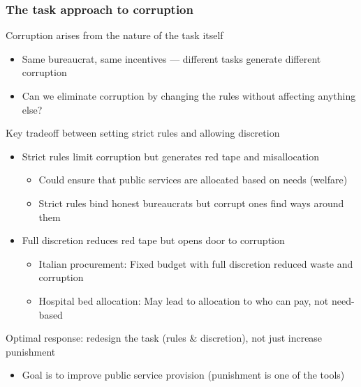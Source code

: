 \documentclass[aspectratio=169]{beamer}
\begin{document}
\begin{frame}
\frametitle{The task approach to corruption}
Corruption arises from the nature of the task itself
\begin{itemize}\setlength\itemsep{3pt}
\item Same bureaucrat, same incentives — different tasks generate different corruption
\item Can we eliminate corruption by changing the rules without affecting anything else?
\end{itemize}\medskip
Key tradeoff between setting strict rules and allowing discretion
\begin{itemize}\setlength\itemsep{3pt}
\item Strict rules limit corruption but generates red tape and misallocation
\begin{itemize}\setlength\itemsep{3pt}
\item Could ensure that public services are allocated based on needs (welfare)
\item Strict rules bind honest bureaucrats but corrupt ones find ways around them
\end{itemize}
\item Full discretion reduces red tape but opens door to corruption
\begin{itemize}\setlength\itemsep{3pt}
\item Italian procurement: Fixed budget with full discretion reduced waste and corruption
\item Hospital bed allocation: May lead to allocation to who can pay, not need-based
\end{itemize}
\end{itemize}\medskip
Optimal response: redesign the task (rules \& discretion), not just increase punishment
\begin{itemize}\setlength\itemsep{3pt}
\item Goal is to improve public service provision (punishment is one of the tools)
\end{itemize}
\end{frame}
\end{document}
